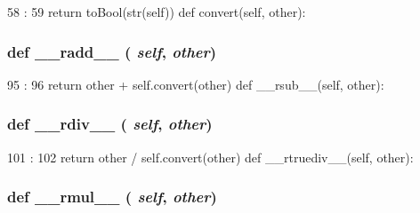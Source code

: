 \begin{DoxyCode}
58                          :
59         return toBool(str(self))
    def convert(self, other):
\end{DoxyCode}
\hypertarget{classm5_1_1util_1_1smartdict_1_1Variable_a6c4d3a579d0fd0dc4796630edc287194}{
\subsubsection[{\_\-\_\-radd\_\-\_\-}]{\setlength{\rightskip}{0pt plus 5cm}def \_\-\_\-radd\_\-\_\- ( {\em self}, \/   {\em other})}}
\label{classm5_1_1util_1_1smartdict_1_1Variable_a6c4d3a579d0fd0dc4796630edc287194}



\begin{DoxyCode}
95                              :
96         return other + self.convert(other)
    def __rsub__(self, other):
\end{DoxyCode}
\hypertarget{classm5_1_1util_1_1smartdict_1_1Variable_af32e4a451632afde7f8e9d45146b56cf}{
\subsubsection[{\_\-\_\-rdiv\_\-\_\-}]{\setlength{\rightskip}{0pt plus 5cm}def \_\-\_\-rdiv\_\-\_\- ( {\em self}, \/   {\em other})}}
\label{classm5_1_1util_1_1smartdict_1_1Variable_af32e4a451632afde7f8e9d45146b56cf}



\begin{DoxyCode}
101                              :
102         return other / self.convert(other)
    def __rtruediv__(self, other):
\end{DoxyCode}
\hypertarget{classm5_1_1util_1_1smartdict_1_1Variable_a1f6ed07429726fb8ffc131d2fea52662}{
\subsubsection[{\_\-\_\-rmul\_\-\_\-}]{\setlength{\rightskip}{0pt plus 5cm}def \_\-\_\-rmul\_\-\_\- ( {\em self}, \/   {\em other})}}
\label{classm5_1_1util_1_1smartdict_1_1Variable_a1f6ed07429726fb8ffc131d2fea52662}



